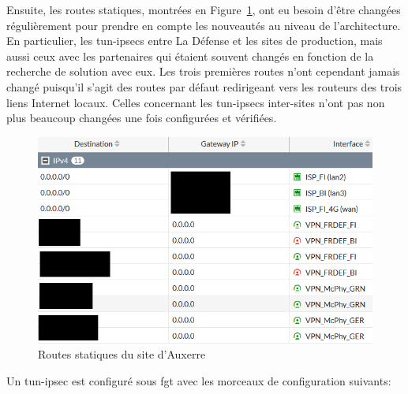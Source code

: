 \documentclass[12pt, oneside, a4paper, titlepage]{report}
\begin{document}
Ensuite, les routes statiques, montrées en Figure~\ref{fig:fgt-auxr/routes}, ont
eu besoin d'être changées régulièrement pour prendre en compte les nouveautés au
niveau de l'architecture. En particulier, les \glspl{tun-ipsec} entre La Défense
et les sites de production, mais aussi ceux avec les partenaires qui étaient
souvent changés en fonction de la recherche de solution avec eux. Les trois
premières routes n'ont cependant jamais changé puisqu'il s'agit des routes par
défaut redirigeant vers les routeurs des trois liens Internet locaux. Celles
concernant les \glspl{tun-ipsec} inter-sites n'ont pas non plus beaucoup
changées une fois configurées et vérifiées.

\begin{figure}[h!]
    \centering
    \includegraphics[width = 0.8\linewidth]{img/fgt-auxr/routes.png}
    \caption{Routes statiques du site d'Auxerre}%
    \label{fig:fgt-auxr/routes}
\end{figure}
\FloatBarrier{}

Un \gls{tun-ipsec} est configuré sous \acrlong{fgt} avec les morceaux de
configuration suivants:
\end{document}

